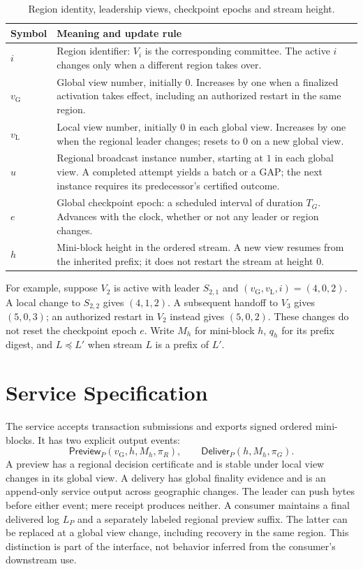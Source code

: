 \documentclass[11pt,a4paper,onecolumn]{article}
\newcommand{\gv}{v_{\mathrm G}}
\newcommand{\lv}{v_{\mathrm L}}
\newcommand{\pre}{\preceq}
\newcommand{\Tag}[1]{\mathsf{#1}}
\theoremstyle{remark}\newtheorem{example}[definition]{Example}
\begin{document}
\begin{table}[H]\centering\small
\begin{tabularx}{\textwidth}{@{}p{}Y@{}}\toprule
Symbol & Meaning and update rule\\\midrule
$i$ & Region identifier: $V_i$ is the corresponding committee. The active $i$
changes only when a different region takes over.\\
$\gv$ & Global view number, initially $0$. Increases by one when a finalized
activation takes effect, including an authorized restart in the same region.\\
$\lv$ & Local view number, initially $0$ in each global view. Increases by one
when the regional leader changes; resets to $0$ on a new global view.\\
$u$ & Regional broadcast instance number, starting at $1$ in each global view.
A completed attempt yields a batch or a GAP; the next instance requires its
predecessor's certified outcome.\\
$e$ & Global checkpoint epoch: a scheduled interval of duration $T_G$.
Advances with the clock, whether or not any leader or region changes.\\
$h$ & Mini-block height in the ordered stream. A new view resumes from the
inherited prefix; it does not restart the stream at height $0$.\\\bottomrule
\end{tabularx}
\caption{Region identity, leadership views, checkpoint epochs and stream height.}
\end{table}

For example, suppose $V_2$ is active with leader $S_{2,1}$ and
$(\gv,\lv,i)=(4,0,2)$. A local change to $S_{2,2}$ gives $(4,1,2)$.
A subsequent handoff to $V_3$ gives $(5,0,3)$; an authorized restart in $V_2$
instead gives $(5,0,2)$. These changes do not reset the checkpoint epoch $e$.
Write $M_h$ for mini-block $h$, $q_h$ for its prefix digest, and $L\pre L'$
when stream $L$ is a prefix of $L'$.

\section{Service Specification}\label{sec:spec}
The service accepts transaction submissions and exports signed ordered
mini-blocks. It has two explicit output events:
\[
 \Tag{Preview}_P(\gv,h,M_h,\pi_R),\qquad
 \Tag{Deliver}_P(h,M_h,\pi_G).
\]
A preview has a regional decision certificate and is stable under local view
changes in its global view. A delivery has global finality evidence and is an
append-only service output across geographic changes. The leader can push bytes
before either event; mere receipt produces neither. A consumer maintains a
final delivered log $L_P$ and a separately labeled regional preview suffix.
The latter can be replaced at a global view change, including recovery
in the same region. This distinction is part
of the interface, not behavior inferred from the consumer's downstream use.
\end{document}
